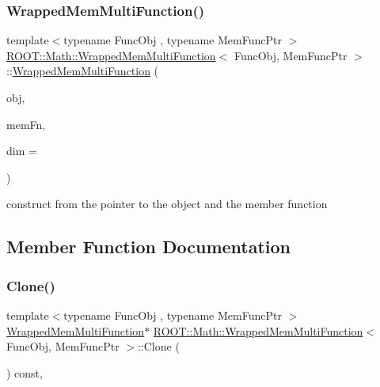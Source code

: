 \subsubsection{\texorpdfstring{WrappedMemMultiFunction()}{WrappedMemMultiFunction()}\hspace{0.1cm}{\footnotesize\ttfamily [3/3]}}
{\footnotesize\ttfamily template$<$typename Func\+Obj , typename Mem\+Func\+Ptr $>$ \\
\mbox{\hyperlink{classROOT_1_1Math_1_1WrappedMemMultiFunction}{R\+O\+O\+T\+::\+Math\+::\+Wrapped\+Mem\+Multi\+Function}}$<$ Func\+Obj, Mem\+Func\+Ptr $>$\+::\mbox{\hyperlink{classROOT_1_1Math_1_1WrappedMemMultiFunction}{Wrapped\+Mem\+Multi\+Function}} (\begin{DoxyParamCaption}\item[{Func\+Obj \&}]{obj,  }\item[{Mem\+Func\+Ptr}]{mem\+Fn,  }\item[{unsigned int}]{dim = {} }\end{DoxyParamCaption})\hspace{0.3cm}{\ttfamily [inline]}}

construct from the pointer to the object and the member function 

\subsection{Member Function Documentation}
\mbox{\label{classROOT_1_1Math_1_1WrappedMemMultiFunction_ab9f49fc9a151e8d921dbe9cb148c1fc8}} 
\subsubsection{\texorpdfstring{Clone()}{Clone()}\hspace{0.1cm}{\footnotesize\ttfamily [1/3]}}
{\footnotesize\ttfamily template$<$typename Func\+Obj , typename Mem\+Func\+Ptr $>$ \\
\mbox{\hyperlink{classROOT_1_1Math_1_1WrappedMemMultiFunction}{Wrapped\+Mem\+Multi\+Function}}$\ast$ \mbox{\hyperlink{classROOT_1_1Math_1_1WrappedMemMultiFunction}{R\+O\+O\+T\+::\+Math\+::\+Wrapped\+Mem\+Multi\+Function}}$<$ Func\+Obj, Mem\+Func\+Ptr $>$\+::Clone (\begin{DoxyParamCaption}{ }\end{DoxyParamCaption}) const\hspace{0.3cm}{\ttfamily [inline]}, {\ttfamily [virtual]}}



